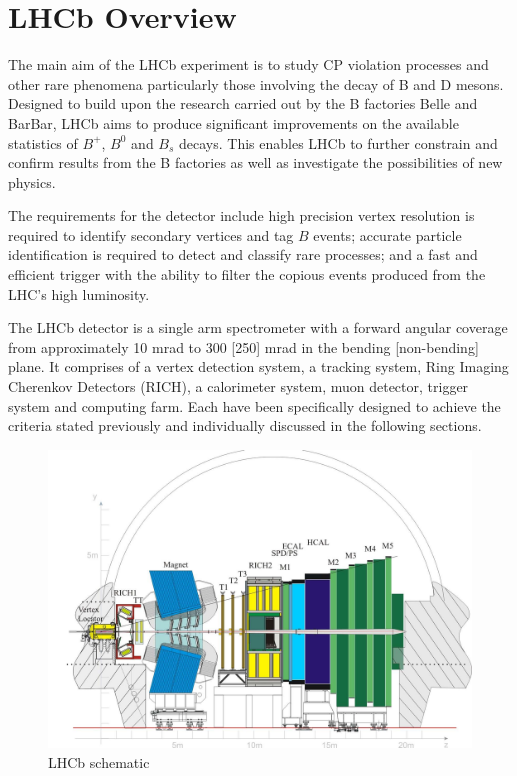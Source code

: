 \section{LHCb Overview}

The main aim of the LHCb experiment is to study CP violation processes and other rare phenomena particularly those involving the decay of  B and D mesons. Designed to build upon the research carried out by the B factories Belle and BarBar, LHCb aims to produce significant improvements on the available statistics of $B^+$, $B^0$ and $B_s$ decays. This enables LHCb to further constrain and confirm results from the B factories as well as investigate the possibilities of new physics.

The requirements for the detector include high precision vertex resolution is required to identify secondary vertices and tag $B$ events; accurate particle identification is required to detect and classify rare processes; and a fast and efficient trigger with the ability to filter the copious events produced from the LHC's high luminosity.

The LHCb detector is a single arm spectrometer with a forward angular coverage from approximately 10 mrad to 300 [250] mrad in the bending [non-bending] plane. It comprises of a vertex detection system, a tracking system, Ring Imaging Cherenkov Detectors (RICH), a calorimeter system, muon detector, trigger system and computing farm. Each have been specifically designed to achieve the criteria stated previously and individually discussed in the following sections.

\begin{figure}
	\includegraphics[width=\columnwidth]{Chapters/detector/images/lhcb_schematic.jpg}
	\caption{LHCb schematic}
	\label{fig: lhcb_schematic}
\end{figure}

